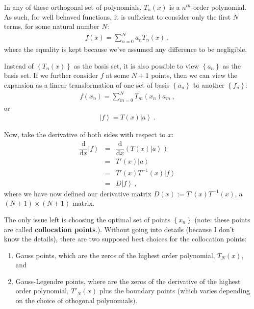 \documentclass[11pt]{amsdtx}
\newcommand{\ud}{\mathrm{d}}
\newcommand{\ket}[1]{\left| #1 \right\rangle}
\begin{document}
In any of these orthogonal set of polynomials, $T_n(x)$ is a $n^{th}$-order polynomial.  As such, for well behaved functions, it is sufficient to consider only the first $N$ terms, for some natural number $N$:
\begin{eqnarray}
	f(x) = \sum_{n = 0}^{N} a_n T_n(x)~,
\end{eqnarray}
where the equality is kept because we've assumed any difference to be negligible.

Instead of $\left\lbrace T_n(x) \right\rbrace$ as the basis set, it is also possible to view $\left\lbrace a_n \right\rbrace$ as the basis set.  If we further consider $f$ at some $N+1$ points, then we can view the expansion as a linear transformation of one set of basis $\left\lbrace a_n \right\rbrace$ to another $\left\lbrace f_n \right\rbrace$:
\begin{eqnarray}
	f(x_n) = \sum_{m=0}^N T_m(x_n) a_m~,
\end{eqnarray}
or
\begin{eqnarray}
	\ket{f} = T(x) \ket{a}~.
\end{eqnarray}

Now, take the derivative of both sides with respect to $x$:
\begin{eqnarray}
	\dfrac{\ud}{\ud x} \ket{f} &=& \dfrac{\ud}{\ud x} \left( T(x) \ket{a} \right) \\
	\ &=& T'(x) \ket{a} \\
	\ &=& T'(x) T^{-1}(x) \ket{f}  \\
	\ &=& D \ket{f}~,
\end{eqnarray}
where we have now defined our derivative matrix $D(x) := T'(x) T^{-1}(x)$, a $(N+1) \times (N+1)$ matrix.

The only issue left is choosing the optimal set of points $\left\lbrace x_n \right\rbrace$ (note: these points are called \textbf{collocation points}.).  Without going into details (because I don't know the details), there are two supposed best choices for the collocation points:
\begin{enumerate}
	\item Gauss points, which are the zeros of the highest order polynomial, $T_N(x)$, and
	\item Gauss-Legendre points, where are the zeros of the derivative of the highest order polynomial, $T'_N(x)$ plus the boundary points (which varies depending on the choice of othogonal polynomials).
\end{enumerate}
\end{document}

